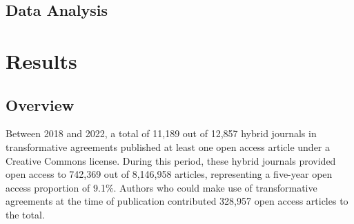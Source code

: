 \documentclass[a4paper,man,floatsintext,longtable,noextraspace,12pt]{apa6}
\begin{document}
\hypertarget{data-analysis}{%
\subsection{Data Analysis}\label{data-analysis}}

\hypertarget{results}{%
\section{Results}\label{results}}

\hypertarget{overview}{%
\subsection{Overview}\label{overview}}

Between 2018 and 2022, a total of 11,189 out of 12,857 hybrid journals
in transformative agreements published at least one open access article
under a Creative Commons license. During this period, these hybrid
journals provided open access to 742,369 out of 8,146,958 articles,
representing a five-year open access proportion of 9.1\%. Authors who
could make use of transformative agreements at the time of publication
contributed 328,957 open access articles to the total.
\end{document}
